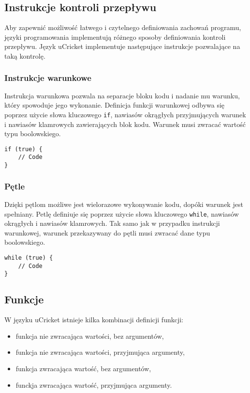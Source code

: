 \subsection{Instrukcje kontroli przepływu}
Aby zapewnić możliwość łatwego i czytelnego definiowania zachowań programu, języki programowania implementują różnego sposoby definiowania kontroli przepływu. Język uCricket implementuje następujące instrukcje pozwalające na taką kontrolę.

\subsubsection{Instrukcje warunkowe}
Instrukcja warunkowa pozwala na separacje bloku kodu i nadanie mu warunku, który spowoduje jego wykonanie. Definicja funkcji warunkowej odbywa się poprzez użycie słowa kluczowego \lstinline|if|, nawiasów okrągłych przyjmujących warunek i nawiasów klamrowych zawierających blok kodu. Warunek musi zwracać wartość typu boolowskiego.
\begin{lstlisting}
if (true) {
	// Code
}
\end{lstlisting}

\subsubsection{Pętle}
Dzięki pętlom możliwe jest wielorazowe wykonywanie kodu, dopóki warunek jest spełniany. Petlę definiuje się poprzez użycie słowa kluczowego \lstinline|while|, nawiasów okrągłych i nawiasów klamrowych. Tak samo jak w przypadku instrukcji warunkowej, warunek przekazywany do pętli musi zwracać dane typu boolowskiego.
\begin{lstlisting}
while (true) {
	// Code
}
\end{lstlisting}
 
\subsection{Funkcje}
W języku uCricket istnieje kilka kombinacji definicji funkcji:
\begin{itemize}
\item funkcja nie zwracająca wartości, bez argumentów,
\item funkcja nie zwracająca wartości, przyjmująca argumenty,
\item funkcja zwracająca wartość, bez argumentów,
\item funckja zwracająca wartość, przyjmująca argumenty. 
\end{itemize}

